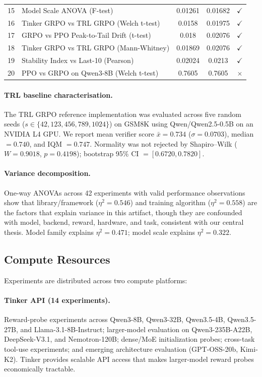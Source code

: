\documentclass{article}
\begin{document}
\begin{table}[!ht]
\begin{tabular}{@{}rp{6.2cm}ccc@{}}
        15 & Model Scale ANOVA (F-test) & 0.01261 & 0.01682 & $\checkmark$ \\
        16 & Tinker GRPO vs TRL GRPO (Welch t-test) & 0.0158 & 0.01975 & $\checkmark$ \\
        17 & GRPO vs PPO Peak-to-Tail Drift (t-test) & 0.018 & 0.02076 & $\checkmark$ \\
        18 & Tinker GRPO vs TRL GRPO (Mann-Whitney) & 0.01869 & 0.02076 & $\checkmark$ \\
        19 & Stability Index vs Last-10 (Pearson) & 0.02024 & 0.0213 & $\checkmark$ \\
        20 & PPO vs GRPO on Qwen3-8B (Welch t-test) & 0.7605 & 0.7605 & $\times$ \\
\bottomrule
\end{tabular}
\end{table}

\paragraph{TRL baseline characterisation.}
The TRL GRPO reference implementation was evaluated across five random seeds
($s \in \{42, 123, 456, 789, 1024\}$) on GSM8K using Qwen/Qwen2.5-0.5B on
an NVIDIA L4 GPU. We report mean verifier score $\bar{x} = 0.734$ ($\sigma = 0.0703$),
median $= 0.740$, and IQM $= 0.747$. Normality was not rejected by Shapiro--Wilk
($W = 0.9018$, $p = 0.4198$); bootstrap 95\% CI $= [0.6720, 0.7820]$.

\paragraph{Variance decomposition.}
One-way ANOVAs across 42 experiments with valid performance observations show
that library/framework ($\eta^2 = 0.546$) and training algorithm ($\eta^2 = 0.558$)
are the factors that explain variance in this artifact, though they are confounded with model, backend, reward, hardware, and task, consistent with our central thesis. Model
family explains $\eta^2 = 0.471$; model scale explains $\eta^2 = 0.322$.

\subsection{Compute Resources}

Experiments are distributed across two compute platforms:

\paragraph{Tinker API (14 experiments).}
Reward-probe experiments across Qwen3-8B, Qwen3-32B, Qwen3.5-4B, Qwen3.5-27B,
and Llama-3.1-8B-Instruct; larger-model evaluation on Qwen3-235B-A22B,
DeepSeek-V3.1, and Nemotron-120B; dense/MoE initialization probes; cross-task
tool-use experiments; and emerging architecture evaluation (GPT-OSS-20b,
Kimi-K2). Tinker provides scalable API access that makes larger-model
reward probes economically tractable.
\end{document}
